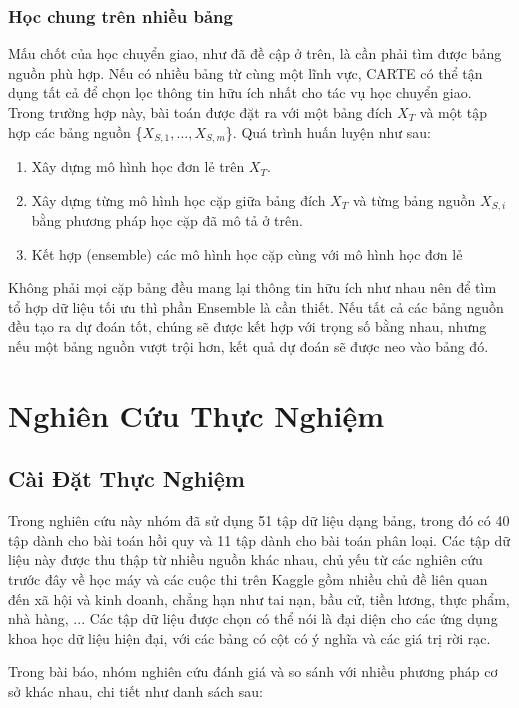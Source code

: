 \documentclass{article}
\begin{document}
\subsubsection{Học chung trên nhiều bảng}
Mấu chốt của học chuyển giao, như đã đề cập ở trên, là cần phải tìm được bảng nguồn phù hợp. Nếu có nhiều bảng từ cùng một lĩnh vực, CARTE có thể tận dụng tất cả để chọn lọc thông tin hữu ích nhất cho tác vụ học chuyển giao. Trong trường hợp này, bài toán được đặt ra với một bảng đích $X_T$ và một tập hợp các bảng nguồn \{$X_{S,1}, ..., X_{S,m}$\}. Quá trình huấn luyện như sau:
\begin{enumerate}
    \item Xây dựng mô hình học đơn lẻ trên $X_T$.
    \item Xây dựng từng mô hình học cặp giữa bảng đích $X_T$ và từng bảng nguồn $X_{S,i}$ bằng phương pháp học cặp đã mô tả ở trên.
    \item Kết hợp (ensemble) các mô hình học cặp cùng với mô hình học đơn lẻ
\end{enumerate}

Không phải mọi cặp bảng đều mang lại thông tin hữu ích như nhau nên để tìm tổ hợp dữ liệu tối ưu thì phần Ensemble là cần thiết. Nếu tất cả các bảng nguồn đều tạo ra dự đoán tốt, chúng sẽ được kết hợp với trọng số bằng nhau, nhưng nếu một bảng nguồn vượt trội hơn, kết quả dự đoán sẽ được neo vào bảng đó.

\section{Nghiên Cứu Thực Nghiệm}
\subsection{Cài Đặt Thực Nghiệm}
Trong nghiên cứu này nhóm đã sử dụng 51 tập dữ liệu dạng bảng, trong đó có 40 tập dành cho bài toán hồi quy và 11 tập dành cho bài toán phân loại. Các tập dữ liệu này được thu thập từ nhiều nguồn khác nhau, chủ yếu từ các nghiên cứu trước đây về học máy và các cuộc thi trên Kaggle gồm nhiều chủ đề liên quan đến xã hội và kinh doanh, chẳng hạn như tai nạn, bầu cử, tiền lương, thực phẩm, nhà hàng, ... Các tập dữ liệu được chọn có thể nói là đại diện cho các ứng dụng khoa học dữ liệu hiện đại, với các bảng có cột có ý nghĩa và các giá trị rời rạc.

Trong bài báo, nhóm nghiên cứu đánh giá và so sánh với nhiều phương pháp cơ sở khác nhau, chi tiết như danh sách sau: 
\end{document}
